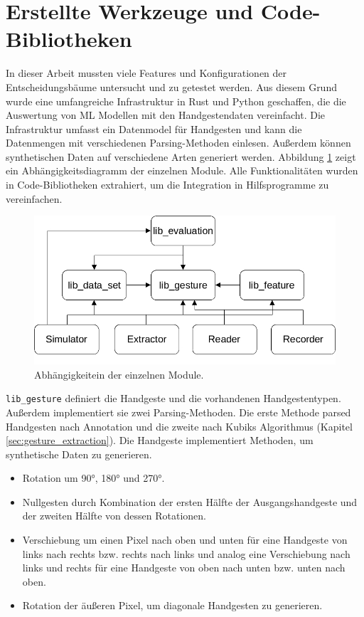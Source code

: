 \section{Erstellte Werkzeuge und Code-Bibliotheken}
\label{sec:recorder}
In dieser Arbeit mussten viele Features und Konfigurationen der Entscheidungsbäume untersucht und zu getestet werden. Aus diesem Grund wurde eine umfangreiche Infrastruktur in Rust und Python geschaffen,
die die Auswertung von ML Modellen mit den Handgestendaten vereinfacht. Die Infrastruktur umfasst ein Datenmodel für Handgesten und kann die Datenmengen mit verschiedenen Parsing-Methoden einlesen.
Außerdem können synthetischen Daten auf verschiedene Arten generiert werden. Abbildung \ref{fig:architecture_overview} zeigt ein Abhängigkeitsdiagramm der einzelnen Module.
Alle Funktionalitäten wurden in Code-Bibliotheken extrahiert, um die Integration in Hilfsprogramme zu vereinfachen.
\begin{figure}
    \centering
    \includegraphics[width=0.75\linewidth]{images/architecture_overview.jpg}
    \caption{Abhängigkeitein der einzelnen Module.}
    \label{fig:architecture_overview}
\end{figure}
\newline
\newline
\texttt{lib\_gesture} definiert die Handgeste und die vorhandenen Handgestentypen. Außerdem implementiert sie zwei Parsing-Methoden. Die erste Methode parsed Handgesten nach Annotation und die
zweite nach Kubiks Algorithmus (Kapitel \ref{sec:gesture_extraction}). Die Handgeste implementiert Methoden, um synthetische Daten zu generieren.
\begin{itemize}
    \item Rotation um 90°, 180° und 270°.
    \item Nullgesten durch Kombination der ersten Hälfte der Ausgangshandgeste und der zweiten Hälfte von dessen Rotationen.
    \item Verschiebung um einen Pixel nach oben und unten für eine Handgeste von links nach rechts bzw. rechts nach links und analog eine Verschiebung nach links und rechts für eine Handgeste von oben nach unten bzw.
    unten nach oben.
    \item Rotation der äußeren Pixel, um diagonale Handgesten zu generieren.
\end{itemize}
